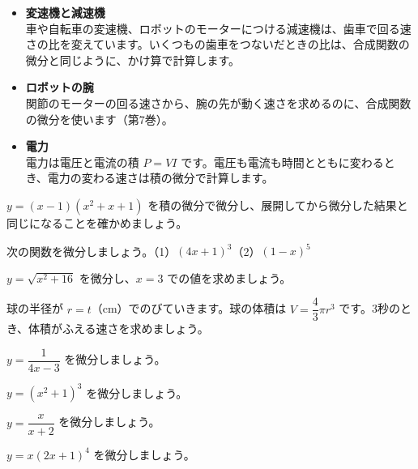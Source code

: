\begin{butsuri}
\begin{itemize}[leftmargin=1.2\zw, itemsep=2pt, topsep=0pt, label={\color{bkPurple}●}]
\item \textbf{変速機と減速機}\\
車や自転車の変速機、ロボットのモーターにつける減速機は、歯車で回る速さの比を変えています。いくつもの歯車をつないだときの比は、合成関数の微分と同じように、かけ算で計算します。
\item \textbf{ロボットの腕}\\
関節のモーターの回る速さから、腕の先が動く速さを求めるのに、合成関数の微分を使います（第7巻）。
\item \textbf{電力}\\
電力は電圧と電流の積 $P=VI$ です。電圧も電流も時間とともに変わるとき、電力の変わる速さは積の微分で計算します。
\end{itemize}
\end{butsuri}

\bkendproblems
{}

\bkproblem $y=(x-1)(x^2+x+1)$ を積の微分で微分し、展開してから微分した結果と同じになることを確かめましょう。

\bkproblem 次の関数を微分しましょう。\quad（1）$(4x+1)^3$\quad（2）$(1-x)^5$

\bkproblem $y=\sqrt{x^2+16}$ を微分し、$x=3$ での値を求めましょう。

\bkproblem 球の半径が $r=t$（cm）でのびていきます。球の体積は $\mbox{$V=\dfrac{4}{3}\pi r^3$}$ です。3秒のとき、体積がふえる速さを求めましょう。

\bkproblem $y=\dfrac{1}{4x-3}$ を微分しましょう。

\bkproblem $y=(x^2+1)^3$ を微分しましょう。

\bkproblem $y=\dfrac{x}{x+2}$ を微分しましょう。


\bkproblem $y=x(2x+1)^4$ を微分しましょう。

